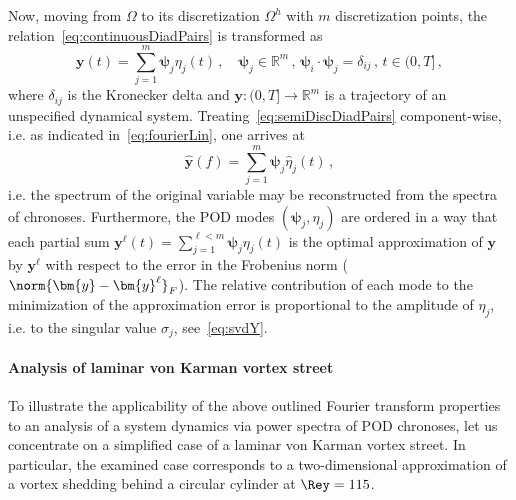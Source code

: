 Now, moving from $\Omega$ to its discretization $\Omega^{h}$ with $m$ discretization points, the relation~\eqref{eq:continuousDiadPairs} is transformed as
\begin{equation}
\label{eq:semiDiscDiadPairs}
    \bm{y}(t) = \sum\limits_{j=1}^{m}\bm{\psi}_{j} \eta_{j}(t)\,,\quad \bm{\psi}_{j}\in\mathbb{R}^{m}\,,\,\bm{\psi}_{i}\cdot\bm{\psi}_{j}=\delta_{ij}\,,\, t\in (0,T]\,,
\end{equation}
where $\delta_{ij}$ is the Kronecker delta and $\bm{y}:(0,T]\rightarrow \mathbb{R}^{m}$ is a trajectory of an unspecified dynamical system. Treating~\eqref{eq:semiDiscDiadPairs} component-wise, i.e. as indicated in~\eqref{eq:fourierLin}, one arrives at
\begin{equation}
\label{eq:}
    \hat{\bm{y}}(f) = \sum_{j=1}^{m}\bm{\psi}_{j}\hat{\eta}_{j}(t)\,,
\end{equation}
i.e. the spectrum of the original variable may be reconstructed from the spectra of chronoses. Furthermore, the POD modes $(\bm{\psi}_{j},\eta_{j})$ are ordered in a way that each partial sum $\bm{y}^{\ell}(t) = \sum_{j=1}^{\ell < m}\bm{\psi}_{j} \eta_{j}(t)$ is the optimal approximation of $\bm{y}$ by $\bm{y}^{\ell}$ with respect to the error in the Frobenius norm ($\norm{\bm{y}-\bm{y}^{\ell}}_{F}$). The relative contribution of each mode to the minimization of the approximation error is proportional to the amplitude of $\eta_{j}$, i.e. to the singular value $\sigma_{j}$, see~\eqref{eq:svdY}.

\paragraph{Analysis of laminar von Karman vortex street}
To illustrate the applicability of the above outlined Fourier transform properties to an analysis of a system dynamics via power spectra of POD chronoses, let us concentrate on a simplified case of a laminar von Karman vortex street. In particular, the examined case corresponds to a two-dimensional approximation of a vortex shedding behind a circular cylinder at $\Rey = 115$.

